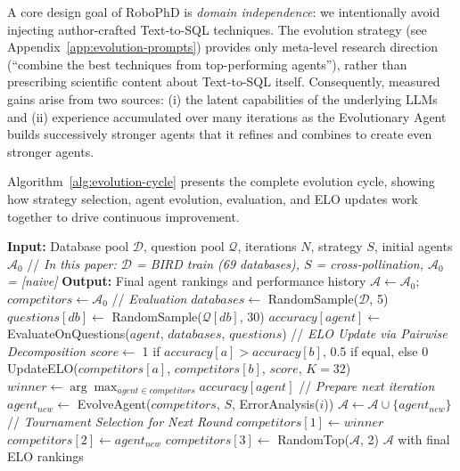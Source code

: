 \documentclass{article}
\begin{document}
A core design goal of RoboPhD is \emph{domain independence}: we intentionally avoid injecting author-crafted Text-to-SQL techniques. The evolution strategy (see Appendix~\ref{app:evolution-prompts}) provides only meta-level research direction (``combine the best techniques from top-performing agents''), rather than prescribing scientific content about Text-to-SQL itself. Consequently, measured gains arise from two sources: (i) the latent capabilities of the underlying LLMs and (ii) experience accumulated over many iterations as the Evolutionary Agent builds successively stronger agents that it refines and combines to create even stronger agents.

Algorithm~\ref{alg:evolution-cycle} presents the complete evolution cycle, showing how strategy selection, agent evolution, evaluation, and ELO updates work together to drive continuous improvement.

\begin{algorithm}[t]
    \caption{RoboPhD Evolution Cycle}
    \label{alg:evolution-cycle}
    \begin{algorithmic}[1]
    \STATE \textbf{Input:} Database pool $\mathcal{D}$, question pool $\mathcal{Q}$, iterations $N$, strategy $S$, initial agents $\mathcal{A}_0$
    \STATE \hspace{2em} // \textit{In this paper: $\mathcal{D}$ = BIRD train (69 databases), $S$ = cross-pollination, $\mathcal{A}_0$ = [naive]}
    \STATE \textbf{Output:} Final agent rankings and performance history
    \STATE
    \STATE $\mathcal{A} \gets \mathcal{A}_0$; $competitors \gets \mathcal{A}_0$
    \STATE
        \STATE // \textit{Evaluation}
        \STATE $databases \gets$ RandomSample($\mathcal{D}$, 5)
            \STATE $questions[db] \gets$ RandomSample($\mathcal{Q}[db]$, 30)
        \ENDFOR
            \STATE $accuracy[agent] \gets$ EvaluateOnQuestions($agent$, $databases$, $questions$)
        \ENDFOR
        \STATE
        \STATE // \textit{ELO Update via Pairwise Decomposition}
            \STATE $score \gets$ 1 if $accuracy[a] > accuracy[b]$, 0.5 if equal, else 0
            \STATE UpdateELO($competitors[a]$, $competitors[b]$, $score$, $K=32$)
        \ENDFOR
        \STATE
        \STATE $winner \gets \arg\max_{agent \in competitors} accuracy[agent]$
        \STATE
        \STATE // \textit{Prepare next iteration}
            \STATE $agent_{new} \gets$ EvolveAgent($competitors$, $S$, ErrorAnalysis($i$))
            \STATE $\mathcal{A} \gets \mathcal{A} \cup \{agent_{new}\}$
            \STATE
            \STATE // \textit{Tournament Selection for Next Round}
            \STATE $competitors[1] \gets winner$ 
            \STATE $competitors[2] \gets agent_{new}$ 
            \STATE $competitors[3] \gets$ RandomTop($\mathcal{A}$, 2) 
        \ENDIF
    \ENDFOR
    \RETURN $\mathcal{A}$ with final ELO rankings
    \end{algorithmic}
    \end{algorithm}
\end{document}

